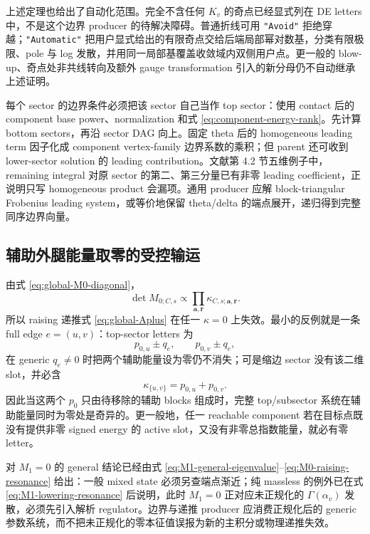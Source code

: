 \documentclass[11pt,a4paper]{ctexart}
\begin{document}
上述定理也给出了自动化范围。完全不含任何 $K_v$ 的奇点已经显式列在 DE letters 中，不是这个边界 producer 的待解决障碍。普通折线可用 \texttt{"Avoid"} 拒绝穿越；\texttt{"Automatic"} 把用户显式给出的有限奇点交给后端局部幂对数基，分类有限极限、pole 与 log 发散，并用同一局部基覆盖收敛域内双侧用户点。更一般的 blow-up、奇点处非共线转向及额外 gauge transformation 引入的新分母仍不自动继承上述证明。

每个 sector 的边界条件必须把该 sector 自己当作 top sector：使用 contact 后的 component base power、normalization 和式 \eqref{eq:component-energy-rank}。先计算 bottom sectors，再沿 sector DAG 向上。固定 theta 后的 homogeneous leading term 因子化成 component vertex-family 边界系数的乘积；但 parent 还可收到 lower-sector solution 的 leading contribution。文献第 4.2 节五维例子中，remaining integral 对原 sector 的第二、第三分量已有非零 leading coefficient，正说明只写 homogeneous product 会漏项。通用 producer 应解 block-triangular Frobenius leading system，或等价地保留 theta/delta 的端点展开，递归得到完整同序边界向量。

\subsection{辅助外腿能量取零的受控输运}

由式 \eqref{eq:global-M0-diagonal}，
\begin{equation}
 \det M_{0;C,s}\propto
 \prod_{\bm a,\bm r}\kappa_{C,s;\bm a,\bm r}.
 \label{eq:M0-determinant-letters}
\end{equation}
所以 raising 递推式 \eqref{eq:global-Aplus} 在任一 $\kappa=0$ 上失效。最小的反例就是一条 full edge $e=(u,v)$：top-sector letters 为
\begin{equation}
 p_{0,u}\pm q_e,
 \qquad
 p_{0,v}\pm q_e,
 \end{equation}
在 generic $q_e\neq0$ 时把两个辅助能量设为零仍不消失；可是缩边 sector 没有该二维 slot，并必含
\begin{equation}
 \kappa_{\{u,v\}}=p_{0,u}+p_{0,v}.
 \label{eq:contracted-zero-letter}
\end{equation}
因此当这两个 $p_0$ 只由待移除的辅助 blocks 组成时，完整 top/subsector 系统在辅助能量同时为零处是奇异的。更一般地，任一 reachable component 若在目标点既没有提供非零 signed energy 的 active slot，又没有非零总指数能量，就必有零 letter。

对 $M_1=0$ 的 general 结论已经由式 \eqref{eq:M1-general-eigenvalue}--\eqref{eq:M0-raising-resonance} 给出：一般 mixed state 必须另查端点渐近；纯 massless 的例外已在式 \eqref{eq:M1-lowering-resonance} 后说明，此时 $M_1=0$ 正对应未正规化的 $\Gamma(\alpha_v)$ 发散，必须先引入解析 regulator。边界与递推 producer 应消费正规化后的 generic 参数系统，而不把未正规化的零本征值误报为新的主积分或物理递推失效。
\end{document}
